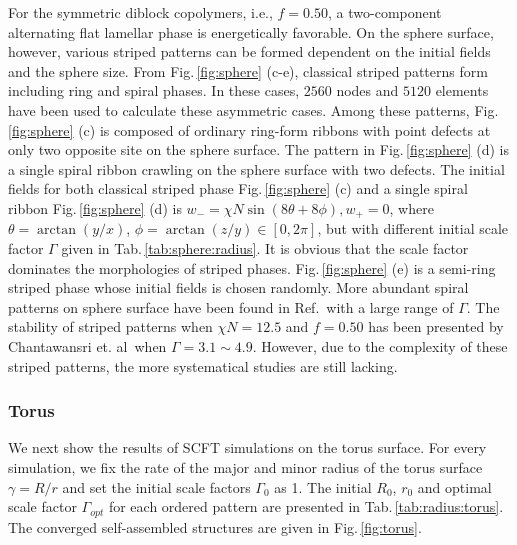 \documentclass[final,1p,times]{elsarticle}
\begin{document}
For the symmetric diblock copolymers, i.e., $f=0.50$, a two-component
alternating flat lamellar phase is energetically favorable. On the sphere
surface, however, various striped patterns can be formed dependent on the
initial fields and the sphere size.  From Fig.\,\ref{fig:sphere} (c-e),
classical striped patterns form including ring and spiral phases.  In these
cases, $2560$ nodes and $5120$ elements have been used to calculate these
asymmetric cases.  Among these patterns, Fig.\,\ref{fig:sphere} (c) is composed
of ordinary ring-form ribbons with point defects at only two opposite site on
the sphere surface.  The pattern in Fig.\,\ref{fig:sphere} (d) is a single
spiral ribbon crawling on the sphere surface with two defects.  The initial
fields for both classical striped phase  Fig.\,\ref{fig:sphere} (c) and a
single spiral ribbon Fig.\,\ref{fig:sphere} (d)  is $w_{-} = \chi
N\sin(8\theta+8\phi), w_{+} = 0$, where $\theta=\arctan(y/x)$,
$\phi=\arctan(z/y) \in [0, 2\pi]$, but with different initial scale factor
$\Gamma$ given in Tab.\,\ref{tab:sphere:radius}. It is obvious that the scale
factor dominates the morphologies of striped phases.  Fig.\,\ref{fig:sphere}
(e) is a semi-ring striped phase whose initial fields is chosen randomly.
More abundant spiral patterns on sphere surface have been found in
Ref.\,\cite{li2006self} with a large range of $\Gamma$. The stability of
striped patterns when $\chi N =12.5$ and $f=0.50$ has been presented by
Chantawansri et. al\,\cite{chantawansri2007} when $\Gamma=3.1 \sim 4.9$.
However, due to the complexity of these striped patterns, the more systematical
studies are still lacking. 

\subsubsection{Torus}
\label{subsubsec:torus}

We next show the results of SCFT simulations on the torus surface. For every
simulation, we fix the rate of the major and minor radius of the torus
surface $\gamma=R/r$ and set the initial scale factors $\Gamma_0$ as 1.  The
initial $R_0$, $r_0$ and optimal scale factor $\Gamma_{opt}$ for each ordered
pattern are presented in Tab.\,\ref{tab:radius:torus}.  The converged
self-assembled structures are given in Fig.\,\ref{fig:torus}. 
\end{document}
